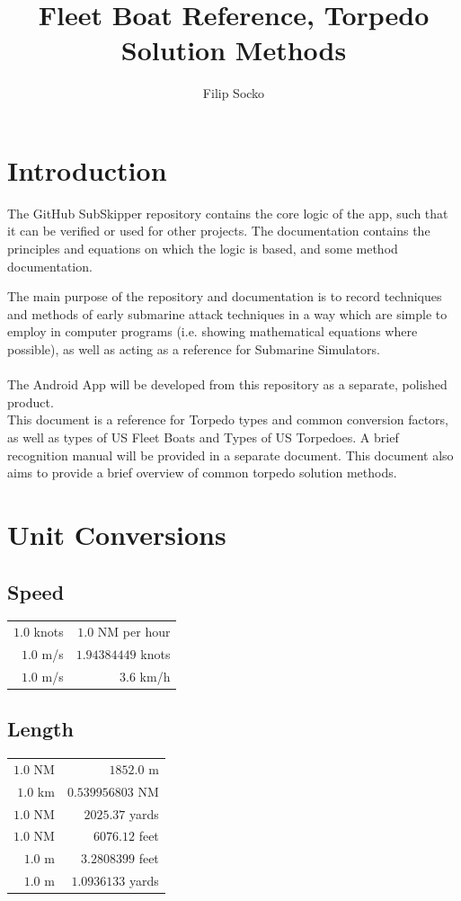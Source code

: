 \documentclass{article}
\author{Filip Socko}
\title{Fleet Boat Reference, Torpedo Solution Methods}
\begin{document}
\maketitle
\pagebreak
\tableofcontents
\pagebreak

\section{Introduction}
The GitHub SubSkipper repository contains the core logic of the app, such that it can be verified or used for other projects. The documentation contains the principles and equations on which the logic is based, and some method documentation.

The main purpose of the repository and documentation is to record techniques and methods of early submarine attack techniques in a way which are simple to employ in computer programs (i.e. showing mathematical equations where possible), as well as acting as a reference for Submarine Simulators.
\\ \\
The Android App will be developed from this repository as a separate, polished product.
\\
This document is a reference for Torpedo types and common conversion factors, as well as types of US Fleet Boats and Types of US Torpedoes. A brief recognition manual will be provided in a separate document. This document also aims to provide a brief overview of common torpedo solution methods.

\section{Unit Conversions}

\subsection{Speed}
\begin{center}
\begin{tabular}{r | r}
$1.0$ knots & $1.0$ NM per hour\\
$1.0$ m/s & $1.94384449$ knots\\
$1.0$ m/s & $3.6$ km/h\\
\end{tabular}
\end{center}

\subsection{Length}
\begin{center}
\begin{tabular}{r | r}
$1.0$ NM & $1852.0$ m\\
$1.0$ km & $0.539956803$ NM\\
$1.0$ NM & $2025.37$ yards\\
$1.0$ NM & $6076.12$ feet\\
$1.0$ m & $3.2808399$ feet\\
$1.0$ m & $1.0936133$ yards\\
\end{tabular}
\end{center}
\end{document}
